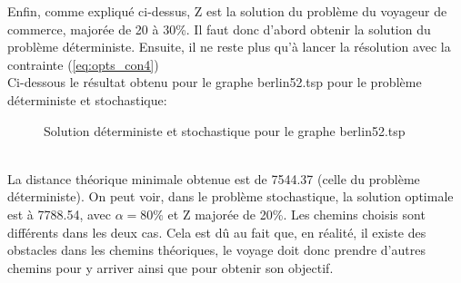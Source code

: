 \documentclass{article}
\begin{document}
Enfin, comme expliqué ci-dessus, Z est la solution du problème du voyageur de commerce, majorée de 20 à 30\%. Il faut donc d'abord obtenir la solution du problème déterministe. Ensuite, il ne reste plus qu'à lancer la résolution avec la contrainte (\ref{eq:opts_con4})\\
Ci-dessous le résultat obtenu pour le graphe berlin52.tsp pour le problème déterministe et stochastique:\\
\begin{figure}[h]\centering
{}
\caption{Solution déterministe et stochastique pour le graphe berlin52.tsp}
\end{figure}\\
La distance théorique minimale obtenue est de 7544.37 (celle du problème déterministe). On peut voir, dans le problème stochastique, la solution optimale est à 7788.54, avec \(\alpha = 80\%\) et Z majorée de 20\%. Les chemins choisis sont différents dans les deux cas. Cela est dû au fait que, en réalité, il existe des obstacles dans les chemins théoriques, le voyage doit donc prendre d'autres chemins pour y arriver ainsi que pour obtenir son objectif.\\
\end{document}
